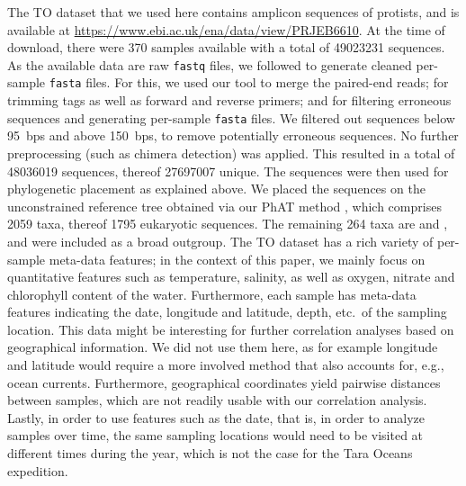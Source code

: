 The \acf{TO} dataset \cite{Karsenti2011,Sunagawa2015,Guidi2016}
that we used here contains amplicon sequences of protists,
and is available at \url{https://www.ebi.ac.uk/ena/data/view/PRJEB6610}.
At the time of download, there were \num{370} samples available
with a total of \num{49 023 231} sequences.
As the available data are raw \texttt{fastq} files,
we followed \cite{FredsMetabarcodingPipeline} to generate cleaned per-sample \texttt{fasta} files.
For this, we used our tool  \cite{Zhang2014} to merge the paired-end reads;
 \cite{Martin2011} for trimming tags as well as forward and reverse primers;
and  \cite{Rognes2016} for filtering erroneous sequences and
generating per-sample \texttt{fasta} files.
We filtered out sequences below \SI{95}{bps} and above \SI{150}{bps}, to remove potentially erroneous sequences.
No further preprocessing (such as chimera detection) was applied.
This resulted in a total of \num{48 036 019} sequences, thereof \num{27 697 007} unique.
The sequences were then used for phylogenetic placement as explained above.
We placed the sequences on the unconstrained  reference tree obtained via our \ac{PhAT} method \cite{Czech2018},
which comprises \num{2 059} taxa, thereof \num{1 795} eukaryotic sequences.
The remaining \num{264} taxa are  and ,
and were included as a broad outgroup.
The \ac{TO} dataset has a rich variety of per-sample meta-data features;
in the context of this paper, we mainly focus on quantitative features such as
temperature, salinity, as well as oxygen, nitrate and chlorophyll content of the water.
Furthermore, each sample has meta-data features indicating the date, longitude and latitude, depth, etc.~of the sampling location.
This data might be interesting for further correlation analyses based on geographical information.
We did not use them here, as for example longitude and latitude would require a more involved method
that also accounts for, e.g., ocean currents.
Furthermore, geographical coordinates yield pairwise distances between samples,
which are not readily usable with our correlation analysis.
Lastly, in order to use features such as the date, that is, in order to analyze samples over time,
the same sampling locations would need to be visited at different times during the year,
which is not the case for the Tara Oceans expedition.

